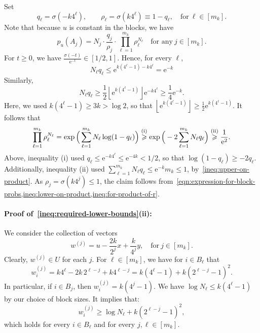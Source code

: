 \documentclass[11pt, letterpaper, hidelinks]{article}
\makeatletter
\renewcommand{\proofname}{\textit{\textbf{Proof}}}
\renewenvironment{proof}[1][\proofname]{\par\pushQED{\qed}\normalfont \topsep6\p@\@plus6\p@\relax\trivlist\item[\hskip\labelsep#1\@addpunct{}]\ignorespaces}{\popQED\endtrivlist\@endpefalse}
\newcommand{\floor}[1]{\left\lfloor #1 \right\rfloor}
\newcommand{\e}{\mathrm{e}}
\newcommand{\1}{\mathbf 1}
\newcommand{\half}{\frac12}
\renewcommand{\leq}{\leqslant}
\renewcommand{\geq}{\geqslant}
\theoremstyle{plain}
\theoremstyle{definition}
\newcommand{\defn}{=}
\makeatother
\begin{document}
\begin{proof}[Proof of~\Cref{lem:a-single-block}]
Set
\[
q_\ell \defn \sigma(-k 4^\ell),
\qquad
\rho_\ell \defn \sigma(k 4^\ell) \equiv 1-q_\ell, \quad \mbox{for}~\ell \in [m_k].
\]
Note that because $u$ is constant in the blocks, we have 
\begin{equation}
\label{eqn:expression-for-block-probs}
p_u(A_j) = N_j \cdot \frac{q_j}{\rho_j} \cdot \prod_{\ell = 1}^{m_k} \rho_\ell^{N_\ell}
	\quad \mbox{for any}~j \in [m_k].
\end{equation}
For $t \geq 0$, we have $\tfrac{\sigma(-t)}{\e^{-t}} \in [1/2, 1]$. 
Hence, for every \(\ell\),
\begin{equation}
\label{ineq:upper-on-product}
N_{\ell}q_\ell \leq \e^{k(4^\ell - 1) - k 4^\ell} = \e^{-k}
\end{equation}
Similarly, 
\begin{equation}
\label{ineq:lower-on-product}
N_{\ell}q_\ell \geq \half \floor{\e^{k(4^\ell - 1)}} \e^{-k 4^\ell} \geq \frac{1}{4} \e^{-k}.
\end{equation}
Here, we used $k(4^\ell-1)\geq 3k >\log 2$, so that $\floor{\e^{k(4^\ell - 1)}} \geq \tfrac{1}{2} \e^{k(4^\ell - 1)}$.
It follows that
\begin{equation}
\label{ineq:for-product-of-r}
\prod_{\ell=1}^{m_k} \rho_\ell^{N_{\ell}}
	= \exp\Big(\sum_{\ell=1}^{m_k} N_{\ell}\log(1-q_\ell)\Big)
	\stackrel{{\rm (i)}}{\geq} \exp\Big(-2\sum_{\ell=1}^{m_k} N_{\ell}q_\ell\Big)
	\stackrel{{\rm(ii)}}{\geq} \frac{1}{\e^2}.
\end{equation}
Above, inequality (i) used $q_\ell \leq \e^{-k 4^\ell} \leq \e^{-4k} < 1/2$, so that $\log(1-q_\ell) \geq -2q_\ell$. 
Additionally, inequality (ii) used $\sum_{\ell=1}^{m_k} N_\ell q_\ell \leq \e^{-k} m_k \leq 1$, by~\cref{ineq:upper-on-product}. 
As $\rho_j = \sigma(k 4^j) \leq 1$, the claim follows from~\cref{eqn:expression-for-block-probs,ineq:lower-on-product,ineq:for-product-of-r}. 

\paragraph{Proof of~\cref{ineq:required-lower-bounds}(ii):}
We consider the collection of vectors 
\[
w^{(j)}
\defn
u - \frac{2k}{2^j} x + \frac{k}{4^j} y, 
\quad \mbox{for}~j \in [m_k].
\]
Clearly, $w^{(j)} \in U$ for each $j$. 
For $\ell \in [m_k]$, we have for $i \in B_\ell$ that 
\[
w^{(j)}_i
=
k4^\ell - 2k\,2^{\ell-j} + k4^{\ell-j}
=
k(4^\ell - 1) + k(2^{\ell-j}-1)^2.
\]
In particular, if $i \in B_j$, then 
$w^{(j)}_i = k(4^j-1)$.
We have $\log N_{\ell} \leq k(4^\ell-1)$ by our choice of block sizes. It implies that: 
\begin{equation}
\label{eq:b-lower-bound}
w^{(j)}_i
\geq
\log N_{\ell} + k(2^{\ell-j}-1)^2,
\end{equation}
which holds for every $i \in B_\ell$ and for every $j, \ell \in [m_k]$.


\end{proof}
\end{document}
